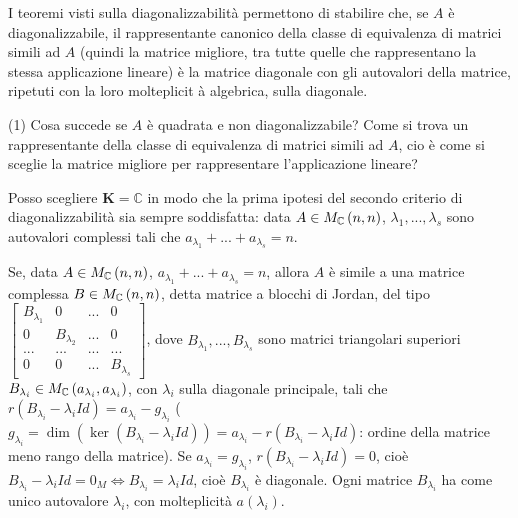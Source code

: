 \documentclass{article}
\begin{document}
I teoremi visti sulla diagonalizzabilit\`{a} permettono di stabilire che, se 
$A$ \`{e} diagonalizzabile, il rappresentante canonico della classe di
equivalenza di matrici simili ad $A$ (quindi la matrice migliore, tra tutte
quelle che rappresentano la stessa applicazione lineare) \`{e} la matrice
diagonale con gli autovalori della matrice, ripetuti con la loro molteplicit%
\`{a} algebrica, sulla diagonale.

(1) Cosa succede se $A$ \`{e} quadrata e non diagonalizzabile? Come si trova
un rappresentante della classe di equivalenza di matrici simili ad $A$, cio%
\`{e} come si sceglie la matrice migliore per rappresentare l'applicazione
lineare?

Posso scegliere $\mathbf{K}=%
\mathbb{C}
$ in modo che la prima ipotesi del secondo criterio di diagonalizzabilit\`{a}
sia sempre soddisfatta: data $A\in M_{%
\mathbb{C}
}\left( n,n\right) $, $\lambda _{1},...,\lambda _{s}$ sono autovalori
complessi tali che $a_{\lambda _{1}}+...+a_{\lambda _{s}}=n$.

Se, data $A\in M_{%
\mathbb{C}
}\left( n,n\right) $, $a_{\lambda _{1}}+...+a_{\lambda _{s}}=n$, allora $A$ 
\`{e} simile a una matrice complessa $B\in M_{%
\mathbb{C}
}\left( n,n\right) $, detta matrice a blocchi di Jordan, del tipo $\left[ 
\begin{array}{cccc}
B_{\lambda _{1}} & 0 & ... & 0 \\ 
0 & B_{\lambda _{2}} & ... & 0 \\ 
... & ... & ... & ... \\ 
0 & 0 & ... & B_{\lambda _{s}}%
\end{array}%
\right] $, dove $B_{\lambda _{1}},...,B_{\lambda _{s}}$ sono matrici
triangolari superiori $B_{\lambda _{i}}\in M_{%
\mathbb{C}
}\left( a_{\lambda _{i}},a_{\lambda _{i}}\right) $, con $\lambda _{i}$ sulla
diagonale principale, tali che $r\left( B_{\lambda _{i}}-\lambda
_{i}Id\right) =a_{\lambda _{i}}-g_{\lambda _{i}}$ ($g_{\lambda _{i}}=\dim
\left( \ker \left( B_{\lambda _{i}}-\lambda _{i}Id\right) \right)
=a_{\lambda _{i}}-r\left( B_{\lambda _{i}}-\lambda _{i}Id\right) $: ordine
della matrice meno rango della matrice). Se $a_{\lambda _{i}}=g_{\lambda
_{i}}$, $r\left( B_{\lambda _{i}}-\lambda _{i}Id\right) =0$, cio\`{e} $%
B_{\lambda _{i}}-\lambda _{i}Id=0_{M}\Longleftrightarrow B_{\lambda
_{i}}=\lambda _{i}Id$, cio\`{e} $B_{\lambda _{i}}$ \`{e} diagonale. Ogni
matrice $B_{\lambda _{i}}$ ha come unico autovalore $\lambda _{i}$, con
molteplicit\`{a} $a\left( \lambda _{i}\right) $.
\end{document}
